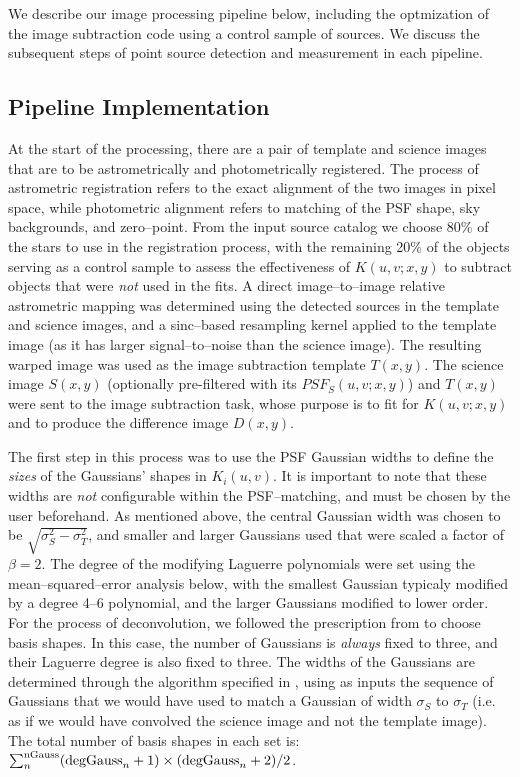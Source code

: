 \documentclass[floatfix, apj]{emulateapj}
\begin{document}
We describe our image processing pipeline below, including the optmization of the image subtraction code using a control sample of sources.
We discuss the subsequent steps of point source detection and measurement in each pipeline.

\subsection{Pipeline Implementation}

At the start of the processing, there are a pair of template and science images that are to be astrometrically and photometrically registered.
The process of astrometric registration refers to the exact alignment of the two images in pixel space, while photometric alignment refers to matching of the PSF shape, sky backgrounds, and zero--point.
From the input source catalog we choose 80\% of the stars to use in the registration process, with the remaining 20\% of the objects serving as a control sample to assess the effectiveness of $K(u,v;x,y)$ to subtract objects that were {\it not} used in the fits.
A direct image--to--image relative astrometric mapping was determined using the detected sources in the template and science images, and a sinc--based resampling kernel applied to the template image (as it has larger signal--to--noise than the science image).
The resulting warped image was used as the image subtraction template $T(x,y)$.
The science image $S(x,y)$ (optionally pre-filtered with its $PSF_S(u,v;x,y)$) and $T(x,y)$ were sent to the image subtraction task, whose purpose is to fit for $K(u,v;x,y)$ and to produce the difference image $D(x,y)$.

The first step in this process was to use the PSF Gaussian widths to define the {\it sizes} of the Gaussians' shapes in $K_i(u,v)$.
It is important to note that these widths are {\it not} configurable within the PSF--matching, and must be chosen by the user beforehand.
As mentioned above, the central Gaussian width was chosen to be $\sqrt{\sigma_S^2 - \sigma_T^2}$, and smaller and larger Gaussians used that were scaled a factor of $\beta = 2$.
The degree of the modifying Laguerre polynomials were set using the mean--squared--error analysis below, with the smallest Gaussian typicaly modified by a degree 4--6 polynomial, and the larger Gaussians modified to lower order.
For the process of deconvolution, we followed the prescription from \cite{0266-5611-26-8-085002} to choose basis shapes.
In this case, the number of Gaussians is {\it always} fixed to three, and their Laguerre degree is also fixed to three.
The widths of the Gaussians are determined through the algorithm specified in \cite{0266-5611-26-8-085002}, using as inputs the sequence of Gaussians that we would have used to match a Gaussian of width $\sigma_S$ to $\sigma_T$ (i.e. as if we would have convolved the science image and not the template image).
The total number of basis shapes in each set is: $\sum_n^{\rm nGauss} ({\rm degGauss}_n+1)\times({\rm degGauss}_n+2)/2$.
\end{document}

